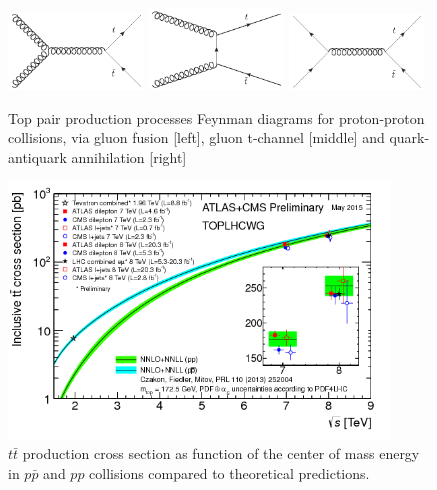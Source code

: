 \begin{figure}[!Hhtbp]
  \begin{center}
    \includegraphics[width=0.32\textwidth]{figs/Gluon_fusion_top_pair.jpg}
    \includegraphics[width=0.32\textwidth]{figs/Gluon_tchannel_top_pair.jpg}
    \includegraphics[width=0.32\textwidth]{figs/Quarks_schannel_top_pair.jpg}
    \caption{Top pair production processes Feynman diagrams for proton-proton collisions, via gluon fusion [left], gluon t-channel [middle] and quark-antiquark annihilation [right]}
    \label{fig:PairProductionFD}
  \end{center}
\end{figure}

\begin{figure}[!Hhtbp]
  \begin{center}
    \includegraphics[width=0.9\textwidth]{figs/toplhcwg_ttxsec_sqrts_may2015.png}
    \caption{$t\bar{t}$ production cross section as function of the center of mass energy in $p\bar{p}$ and $pp$ collisions compared to theoretical predictions.}
    \label{fig:PairProduction}
  \end{center}
\end{figure}

